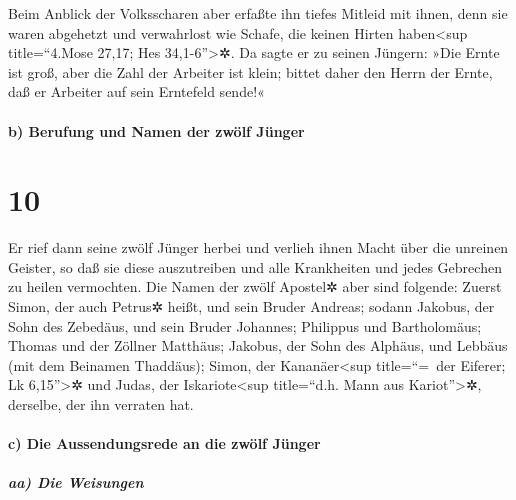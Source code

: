  Beim Anblick der Volksscharen aber erfaßte ihn tiefes
Mitleid mit ihnen, denn sie waren abgehetzt und verwahrlost wie Schafe,
die keinen Hirten haben\textless sup title=``4.Mose 27,17; Hes
34,1-6''\textgreater✲.  Da sagte er zu seinen Jüngern:
»Die Ernte ist groß, aber die Zahl der Arbeiter ist klein;
 bittet daher den Herrn der Ernte, daß er Arbeiter auf
sein Erntefeld sende!«

\hypertarget{b-berufung-und-namen-der-zwuxf6lf-juxfcnger}{%
\paragraph{b) Berufung und Namen der zwölf
Jünger}\label{b-berufung-und-namen-der-zwuxf6lf-juxfcnger}}

\hypertarget{section-9}{%
\section{10}\label{section-9}}

 Er rief dann seine zwölf Jünger herbei und verlieh ihnen
Macht über die unreinen Geister, so daß sie diese auszutreiben und alle
Krankheiten und jedes Gebrechen zu heilen vermochten.  Die
Namen der zwölf Apostel✲ aber sind folgende: Zuerst Simon, der auch
Petrus✲ heißt, und sein Bruder Andreas; sodann Jakobus, der Sohn des
Zebedäus, und sein Bruder Johannes;  Philippus und
Bartholomäus; Thomas und der Zöllner Matthäus; Jakobus, der Sohn des
Alphäus, und Lebbäus (mit dem Beinamen Thaddäus);  Simon,
der Kananäer\textless sup title=``=~der Eiferer; Lk 6,15''\textgreater✲
und Judas, der Iskariote\textless sup title=``d.h. Mann aus
Kariot''\textgreater✲, derselbe, der ihn verraten hat.

\hypertarget{c-die-aussendungsrede-an-die-zwuxf6lf-juxfcnger}{%
\paragraph{c) Die Aussendungsrede an die zwölf
Jünger}\label{c-die-aussendungsrede-an-die-zwuxf6lf-juxfcnger}}

\hypertarget{aa-die-weisungen}{%
\subparagraph{aa) Die Weisungen}\label{aa-die-weisungen}}

